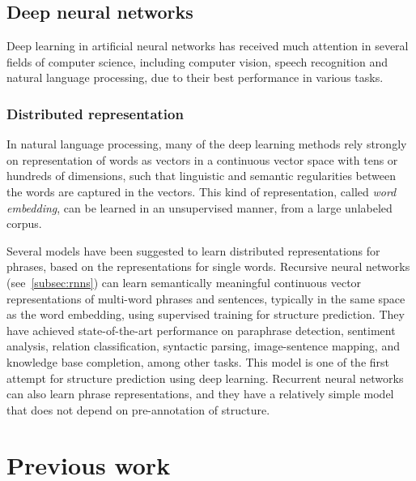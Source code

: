 \documentclass[11pt]{article}
\begin{document}
\subsection{Deep neural networks}

Deep learning in artificial neural networks has received much attention in several fields of computer science, including computer vision, speech recognition and natural language processing, due to their best performance in various tasks\cite{collobert2011nlp}.


\subsubsection{Distributed representation}

In natural language processing, many of the deep learning methods rely strongly on representation of words as vectors in a continuous vector space with tens or hundreds of dimensions\cite{turian2010word}, such that linguistic and semantic regularities between the words are captured in the vectors\cite{mikolov2013linguistic}. This kind of representation, called \textit{word embedding}, can be learned in an unsupervised manner, from a large unlabeled corpus.

Several models have been suggested to learn distributed representations for phrases, based on the representations for single words. Recursive neural networks (see~\ref{subsec:rnns}) can learn semantically meaningful continuous vector representations of multi-word phrases and sentences, typically in the same space as the word embedding, using supervised training for structure prediction\cite{socher2010learning}. They have achieved state-of-the-art performance on paraphrase detection, sentiment analysis, relation classification, syntactic parsing, image-sentence mapping, and knowledge base completion, among other tasks\cite{socher2013parsing}\cite{socher2013recursive}. This model is one of the first attempt for structure prediction using deep learning. Recurrent neural networks can also learn phrase representations, and they have a relatively simple model that does not depend on pre-annotation of structure.



\section{Previous work}
\end{document}
